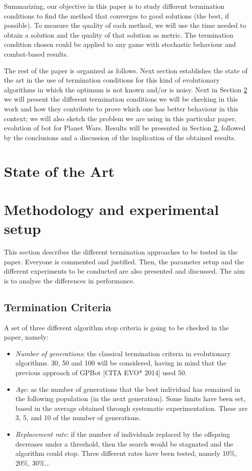 \documentclass[runningheads,a4paper]{llncs}
\begin{document}
Summarizing, our objective in this paper is to study different 
termination conditions to find the method that converges to good 
solutions (the best, if possible). To measure the quality of each 
method, we will use the time needed to obtain a solution and the
 quality of that solution as metric. The termination condition chosen could be applied to any game with
stochastic behaviour and combat-based results.

The rest of the paper is organized as follows. Next section
establishes the state of the art in the use of termination conditions
for this kind of evolutionary algorithms in which the optimum is not
known and/or is noisy. Next in Section \ref{sec:met} we will present the different termination
conditions we will be checking in this work and how they contribute to
prove which one has better behaviour in this context; we will also
sketch the problem we are using in this particular paper, evolution of
bot for Planet Wars. Results will be presented in Section
\ref{sec:met}, followed by the conclusions and a discussion of the
implication of the obtained results.

\section{State of the Art}

\section{Methodology and experimental setup}
\label{sec:met}

This section describes the different termination approaches to be tested in the paper. Everyone is commented and justified.
Then, the parameter setup and the different experiments to be conducted are also presented and discussed. The aim is to analyse the differences in performance.

\subsection{Termination Criteria}
A set of three different algorithm stop criteria is going to be checked in the paper, namely:
\begin{itemize}
    \item \textit{Number of generations}: the classical termination criteria in evolutionary algorithms. 30, 50 and 100 will be considered, having in mind that the previous approach of GPBot [CITA EVO* 2014] used 50.
    \item \textit{Age}: as the number of generations that the best individual has remained in the following population (in the next generation). Some limits have been set, based in the average obtained through systematic experimentation. These are 3, 5, and 10 of the number of generations.
    \item \textit{Replacement rate}: if the number of individuals replaced by the offspring decreases under a threshold, then the search would be stagnated and the algorithm could stop. Three different rates have been tested, namely 10\%, 20\%, 30\%...
\end{itemize}
\end{document}
